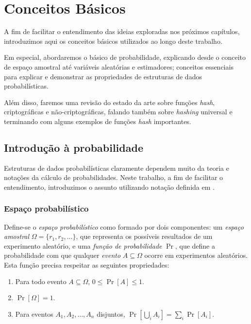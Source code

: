 \chapter{Conceitos Básicos}\label{cap:concepts}

A fim de facilitar o entendimento das ideias exploradas nos próximos capítulos, introduzimos aqui os conceitos básicos utilizados ao longo deste trabalho.

Em especial, abordaremos o básico de probabilidade, explicando desde o conceito de espaço amostral até variáveis aleatórias e estimadores; conceitos essenciais para explicar e demonstrar as propriedades de estruturas de dados probabilísticas. 

Além disso, faremos uma revisão do estado da arte sobre funções \emph{hash}, criptográficas e não-criptográficas, falando também sobre \emph{hashing} universal e terminando com alguns exemplos de funções \emph{hash} importantes.

\section{Introdução à probabilidade}

Estruturas de dados probabilísticas claramente dependem muito da teoria e notações da cálculo de probabilidades. Neste trabalho, a fim de facilitar o entendimento, introduzimos o assunto utilizando notação definida em \cite{figueiredo2007randomizados}.

\subsection{Espaço probabilístico}

Define-se o \emph{espaço probabilístico} como formado por dois componentes: um \emph{espaço amostral} $\Omega = \{r_1, r_2, \ldots\}$, que representa os possíveis resultados de um experimento aleatório, e uma \emph{função de probabilidade} $\Pr$, que define a probabilidade com que qualquer \emph{evento} $A \subseteq \Omega$ ocorre em experimentos aleatórios. Esta função precisa respeitar as seguintes propriedades:

\begin{enumerate}
  \item Para todo evento $A \subseteq \Omega$, $0 \leq \Pr[A] \leq 1$.
  \item $\Pr[\Omega] = 1$.
  \item Para eventos $A_1, A_2, ..., A_n$ disjuntos, $\Pr[\bigcup_i A_i] = \sum_i \Pr[A_i]$.
\end{enumerate}

